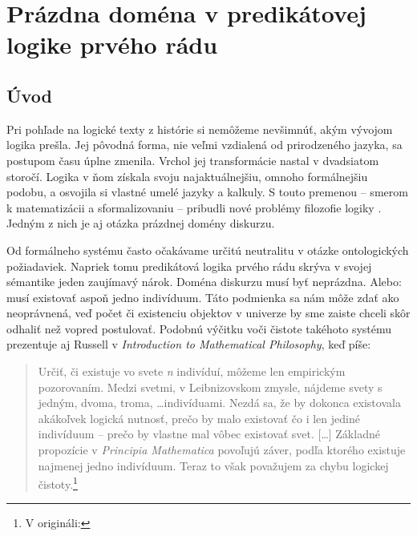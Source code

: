 \documentclass[12pt, letterpaper]{article}
\begin{document}
	\pagebreak
	

\section{Prázdna doména v predikátovej logike prvého rádu}

\subsection{Úvod}
Pri pohľade na logické texty z histórie si nemôžeme nevšimnúť, akým vývojom logika prešla. Jej pôvodná forma, nie veľmi vzdialená od prirodzeného jazyka, sa postupom času úplne zmenila. Vrchol jej transformácie nastal v dvadsiatom storočí. Logika v ňom získala svoju najaktuálnejšiu, omnoho formálnejšiu podobu, a osvojila si vlastné umelé jazyky a kalkuly. S touto premenou -- smerom k matematizácii a sformalizovaniu -- pribudli
nové problémy filozofie logiky \parencite[13--14]{peregrin_filosofie_2017}. Jedným z nich je aj otázka prázdnej domény diskurzu.\par
Od formálneho systému často očakávame určitú neutralitu v otázke ontologických požiadaviek. Napriek tomu predikátová logika prvého rádu skrýva v svojej sémantike jeden zaujímavý nárok. Doména diskurzu musí byť neprázdna. Alebo: musí existovať aspoň jedno indivíduum. Táto podmienka sa nám môže zdať ako neoprávnená, veď počet či existenciu objektov v univerze by sme zaiste chceli skôr odhaliť než vopred postulovať. Podobnú výčitku voči čistote takéhoto systému prezentuje aj Russell v \textit{Introduction to Mathematical Philosophy}, keď píše: 
\begin{center}
\begin{quote}
Určiť, či existuje vo svete \textit{n} indivíduí, môžeme len empirickým pozorovaním. Medzi  svetmi, v Leibnizovskom zmysle, nájdeme svety s jedným, dvoma, troma, \dots indivíduami. Nezdá sa, že by dokonca existovala akákoľvek logická nutnosť, prečo by malo existovať čo i len jediné indivíduum -- prečo by vlastne mal vôbec existovať svet. [\dots] Základné propozície v \textit{Principia Mathematica} povoľujú záver, podľa ktorého existuje najmenej jedno indivíduum. Teraz to však považujem za chybu logickej čistoty.\footnote{V origináli: }\parencite[vlastný preklad,][203]{russell_introduction_1993}
\end{quote}
\end{center}
\end{document}
